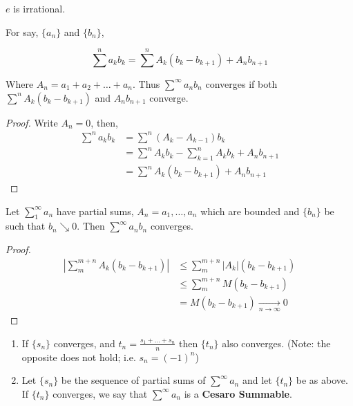 \documentclass[11pt,fleqn]{book} %
\begin{document}
\begin{theorem}
	$e$ is irrational.
\end{theorem}

\begin{theorem}
	For say, $\{a_n\}$ and $\{b_n\}$,
	
	 $$\sum\limits^n a_k b_k = \sum\limits^n A_k(b_k - b_{k+1}) + A_n b_{n+1} $$

	 Where $A_n = a_1 + a_2 + \dots + a_n.$ Thus $\sum\limits^\infty a_n b_n$ converges if both $\sum\limits^n A_k(b_k - b_{k+1})$ and $A_n b_{n+1}$ converge.
\end{theorem}

\begin{proof}
	Write $A_n = 0$, then, 
	\begin{align*}
		\sum\limits^n a_k b_k &= \sum\limits^n (A_k - A_{k-1}) b_k\\
		&= \sum\limits^n A_k b_k - \sum\limits^n_{k=1} A_k b_k + A_n b_{n+1}\\
		&= \sum\limits^n A_k (b_k - b_{k+1}) + A_n b_{n+1}
	\end{align*}
\end{proof}

\begin{theorem}
	Let $\sum\limits^\infty_1 a_n$ have partial sums, $A_n = a_1, \dots, a_n$ which are bounded and $\{b_n\}$ be such that $b_n \searrow 0$. Then $\sum\limits^\infty a_n b_n$ converges.
\end{theorem}

\begin{proof}
	\begin{align*}
		|\sum\limits^{m+n}_m A_k (b_k - b_{k+1})| &\le \sum\limits^{m+n}_m |A_k| (b_k - b_{k+1})\\
		&\le \sum\limits^{m+n}_m M (b_k - b_{k+1})\\
		& = M (b_k - b_{k+1}) \underset{n \to \infty}{\rightarrow} 0
	\end{align*}
\end{proof}

\begin{definition}
	\begin{enumerate}[label = \alph*)]
		\item If $\{s_n\}$ converges, and $t_n = \frac{s_1 + \dots + s_n}{n}$ then $\{t_n\}$ also converges. (Note: the opposite does not hold; i.e. $s_n = (-1)^n$)
		\item Let $\{s_n\}$ be the sequence of partial sums of $\sum\limits^\infty a_n$ and let $\{t_n\}$ be as above. If $\{t_n\}$ converges, we say that $\sum\limits^\infty a_n$ is a \textbf{Cesaro Summable}.
	\end{enumerate}
\end{definition}
\end{document}
